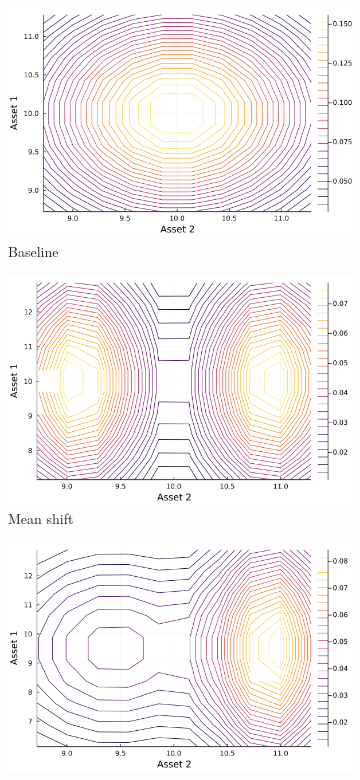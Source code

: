 \documentclass{article}
\begin{document}
\begin{figure}
    \centering
    \begin{subfigure}{0.45\textwidth}
        \includegraphics[width=\textwidth]{../plots/params/baseline/prior.png}
        \caption{Baseline}
        \end{subfigure}
    \begin{subfigure}{0.45\textwidth}
        \includegraphics[width=\textwidth]{../plots/params/a2-mean-shift/prior.png}
        \caption{Mean shift}
    \end{subfigure}
    \begin{subfigure}{0.45\textwidth}
        \includegraphics[width=\textwidth]{../plots/params/a2-meanvar-shift/prior.png}

\end{subfigure}
\end{figure}
\end{document}
